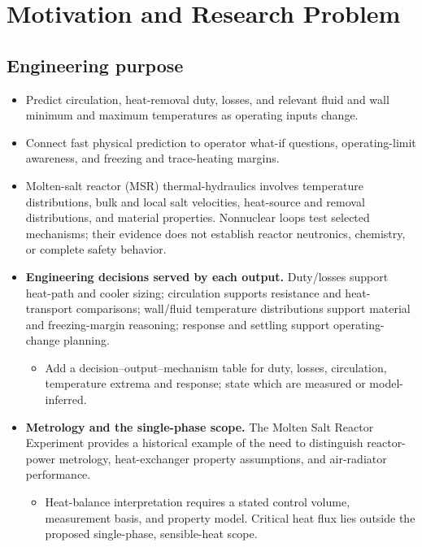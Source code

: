 \section{Motivation and Research Problem}\label{sec:motivation-and-research-problem}

\subsection{Engineering purpose}\label{subsec:engineering-purpose}

\begin{itemize}[leftmargin=*]
\item Predict circulation, heat-removal duty, losses, and relevant fluid and wall minimum and maximum temperatures as operating inputs change.
\item Connect fast physical prediction to operator what-if questions, operating-limit awareness, and freezing and trace-heating margins.
\item Molten-salt reactor (MSR) thermal-hydraulics involves temperature distributions, bulk and local salt velocities, heat-source and removal distributions, and material properties. Nonnuclear loops test selected mechanisms; their evidence does not establish reactor neutronics, chemistry, or complete safety behavior.\cite{brown2020msrphenomena}

\item {}\textbf{Engineering decisions served by each output.} Duty/\allowbreak{}losses support heat-path and cooler sizing; circulation supports resistance and heat-transport comparisons; wall/\allowbreak{}fluid temperature distributions support material and freezing-margin reasoning; response and settling support operating-change planning.\cite{brown2020msrphenomena}
\begin{itemize}
\item Add a decision--output--mechanism table for duty, losses, circulation, temperature extrema and response; state which are measured or model-inferred.
\end{itemize}
\item {}\textbf{Metrology and the single-phase scope.} The Molten Salt Reactor Experiment provides a historical example of the need to distinguish reactor-power metrology, heat-exchanger property assumptions, and air-radiator performance.\cite{gabbard1970msre}
\begin{itemize}
\item Heat-balance interpretation requires a stated control volume, measurement basis, and property model. Critical heat flux lies outside the proposed single-phase, sensible-heat scope.
\end{itemize}
\end{itemize}

